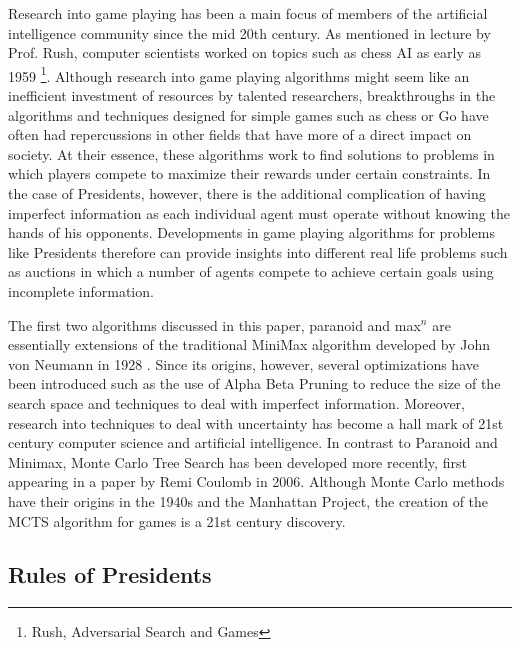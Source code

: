 \documentclass[11pt]{article}
\begin{document}
Research into game playing has been a main focus of members of the artificial intelligence community since the mid 20th century. As mentioned in lecture by Prof. Rush, computer scientists worked on topics such as chess AI as early as 1959 \footnote{Rush, Adversarial Search and Games}. Although research into game playing algorithms might seem like an inefficient investment of resources by talented researchers, breakthroughs in the algorithms and techniques designed for  simple games such as chess or Go have often had repercussions in other fields that have more of a direct impact on society. At their essence, these algorithms work to find solutions to problems in which players compete to maximize their rewards under certain constraints. In the case of Presidents, however, there is the additional complication of having imperfect information as each individual agent must operate without knowing the hands of his opponents. Developments in game playing algorithms for problems like Presidents therefore can provide insights into different real life problems such as auctions in which a number of agents compete to achieve certain goals using incomplete information.

The first two algorithms discussed in this paper, paranoid and max$^n$ are essentially extensions of the traditional MiniMax algorithm developed by John von Neumann in 1928 \cite{kjeldsen01}. Since its origins, however, several optimizations have been introduced such as the use of Alpha Beta Pruning to reduce the size of the search space and techniques to deal with imperfect information. Moreover, research into techniques to deal with uncertainty has become a hall mark of 21st century computer science and artificial intelligence. In contrast to Paranoid and Minimax, Monte Carlo Tree Search has been developed more recently, first appearing in a paper by Remi Coulomb in 2006. Although Monte Carlo methods have their origins in the 1940s and the Manhattan Project, the creation of the MCTS algorithm for games is a 21st century discovery.

\subsection{Rules of Presidents}
\end{document}
